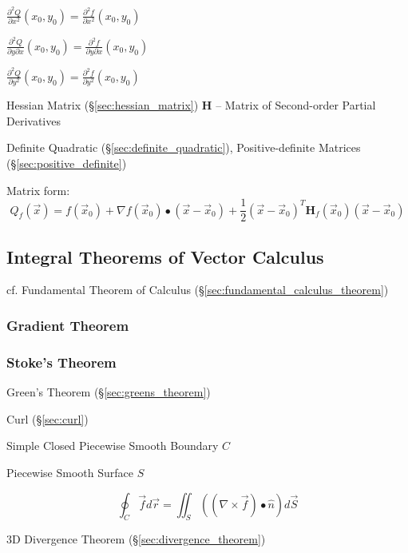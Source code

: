 $\frac{\partial^2{Q}}{\partial{x^2}}(x_0,y_0) =
  \frac{\partial^2{f}}{\partial{x^2}}(x_0,y_0)$

$\frac{\partial^2{Q}}{\partial{y}\partial{x}}(x_0,y_0) =
  \frac{\partial^2{f}}{\partial{y}\partial{x}}(x_0,y_0)$

$\frac{\partial^2{Q}}{\partial{y^2}}(x_0,y_0) =
  \frac{\partial^2{f}}{\partial{y^2}}(x_0,y_0)$

\fist Hessian Matrix (\S\ref{sec:hessian_matrix}) $\mathbf{H}$ -- Matrix of
Second-order Partial Derivatives

\fist Definite Quadratic (\S\ref{sec:definite_quadratic}), Positive-definite
Matrices (\S\ref{sec:positive_definite})

Matrix form:
\[
  Q_f(\vec{x}) = f(\vec{x}_0) + \nabla{f(\vec{x}_0)}\bullet (\vec{x}-\vec{x}_0)
  + \frac{1}{2}(\vec{x}-\vec{x}_0)^T\mathbf{H}_f(\vec{x}_0)(\vec{x}-\vec{x}_0)
\]



\subsection{Integral Theorems of Vector Calculus}
\label{sec:integral_theorems}

cf. Fundamental Theorem of Calculus (\S\ref{sec:fundamental_calculus_theorem})



\subsubsection{Gradient Theorem}\label{sec:gradient_theorem}

\subsubsection{Stoke's Theorem}\label{sec:stokes_theorem}

\fist Green's Theorem (\S\ref{sec:greens_theorem})

Curl (\S\ref{sec:curl})

Simple Closed Piecewise Smooth Boundary $C$

Piecewise Smooth Surface $S$

\[
  \oint_C \vec{f} d\vec{r}
    = \iint_S ((\nabla \times \vec{f}) \bullet \hat{n}) d\vec{S}
\]

\fist 3D Divergence Theorem (\S\ref{sec:divergence_theorem})



